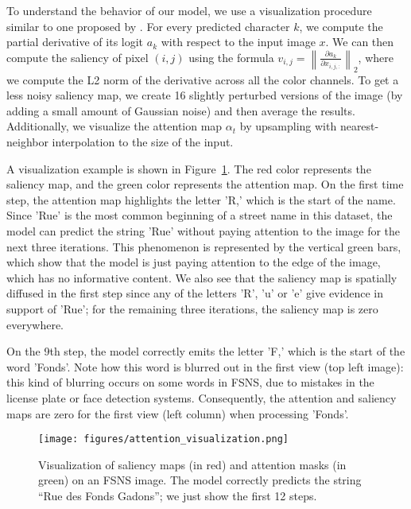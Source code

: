 \documentclass[conference]{IEEEtran}
\begin{document}
To understand the behavior of our model,  we use a visualization
procedure similar to one proposed by \cite{simonyan2013deep}. For
every predicted character $k$, we compute the partial derivative of
its logit $a_{k}$ with respect to the input image $x$. We can then
compute the saliency of pixel $(i,j)$ using the formula $v_{i,j} =
\left\lVert \frac{\partial a_{k}}{\partial x_{i,j,:}} \right\lVert_2$, 
where we compute the L2 norm of the derivative across all the color
channels. To get a less noisy saliency map, we create 16 slightly
perturbed versions of the image (by adding a small amount of Gaussian
noise) and then average the results. Additionally, we visualize the
attention map $\alpha_t$ by upsampling with nearest-neighbor
interpolation to the size of the input. 

A visualization example is shown in Figure~\ref{fig:saliency}. The red
color represents the saliency map, and the green color represents the
attention map. On the first time step, the attention map highlights the
letter 'R,' which is the start of the name. Since 'Rue' is the most
common beginning of a street name in this dataset, the model can
predict the string 'Rue' without paying attention to the image for the
next three iterations. This phenomenon is represented by the vertical
green bars, which show that the model is just paying attention to the
edge of the image, which has no informative content. We also see that
the saliency map is spatially diffused in the first step since any of the
letters 'R', 'u' or 'e' give evidence in support of 'Rue'; for the
remaining three iterations, the saliency map is zero everywhere. 

On the 9th step, the model correctly emits the letter 'F,' which is
the start of the word 'Fonds'. Note how this word is blurred out in
the first view (top left image): this kind of blurring occurs on some words in FSNS,
due to mistakes in the license plate or face detection systems.
Consequently, the attention and saliency maps are zero for the first
view (left column) when processing 'Fonds'.

\begin{figure}
\begin{center}
\texttt{[image: figures/attention\_visualization.png]}  
\caption{Visualization of saliency maps (in red) and attention masks
  (in green) on an FSNS image.
  The model correctly predicts the string ``Rue des Fonds Gadons''; we
  just show the first 12 steps.
}
\label{fig:saliency}
\end{center}
\end{figure}
\end{document}
